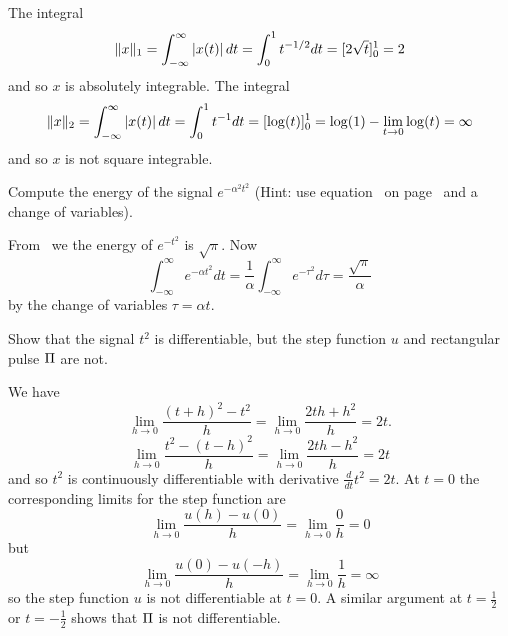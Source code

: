 \begin{excersizelist}
\begin{solution}
\begin{center}
\end{center}
The integral
\[
\|x\|_1 = \int_{-\infty}^\infty \left\vert x(t) \right\vert dt = \int_{0}^1 t^{-1/2} dt = [2\sqrt{t}]_0^1 = 2
\]
and so $x$ is absolutely integrable.  The integral
\[
\|x\|_2 = \int_{-\infty}^\infty \left\vert x(t) \right\vert dt = \int_{0}^1 t^{-1} dt = [\log(t)]_0^1 = \log(1) - \lim_{t \to 0}\log(t) = \infty
\]
and so $x$ is not square integrable.
\end{solution}

\item \label{excer:energyexpchangevar} Compute the energy of the signal $e^{-\alpha^2 t^2}$ (Hint: use equation~ on page~ and a change of variables).
\begin{solution}
From~ we the energy of $e^{-t^2}$ is $\sqrt{\pi}$.  Now
\[
\int_{-\infty}^\infty e^{-\alpha t^2} dt = \frac{1}{\alpha}\int_{-\infty}^\infty e^{-\tau^2} d\tau = \frac{\sqrt{\pi}}{\alpha}
\]
by the change of variables $\tau = \alpha t$.
\end{solution}

\item \label{exer:steprectnotdiff}Show that the signal $t^2$ is differentiable, but the step function $u$ and rectangular pulse $\Pi$ are not.
\begin{solution}
We have
\[
\lim_{h \to 0} \frac{(t + h)^2 - t^2}{h} = \lim_{h \to 0} \frac{2 t h + h^2}{h} = 2t.
\]
\[
\lim_{h \to 0} \frac{t^2 - (t-h)^2}{h} = \lim_{h \to 0} \frac{2 t h - h^2}{h} = 2t
\]
and so $t^2$ is continuously differentiable with derivative $\frac{d}{dt} t^2 = 2t$.  At $t = 0$ the corresponding limits for the step function are
\[
\lim_{h \to 0} \frac{u(h) - u(0)}{h} = \lim_{h \to 0} \frac{0}{h} = 0
\]
but
\[
\lim_{h \to 0} \frac{u(0) - u(-h)}{h} = \lim_{h \to 0} \frac{1}{h} = \infty
\]
so the step function $u$ is not differentiable at $t = 0$.  A similar argument at $t=\tfrac{1}{2}$ or $t = -\tfrac{1}{2}$ shows that $\Pi$ is not differentiable.
\end{solution}


\end{excersizelist}
